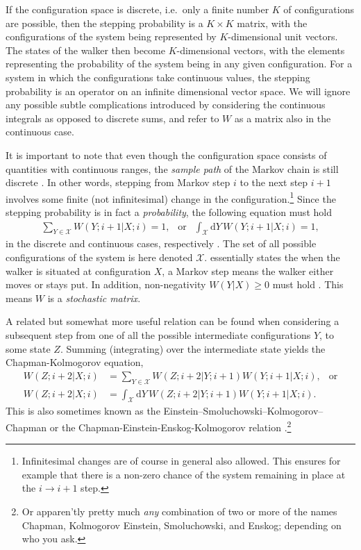 \documentclass[../../master.tex]{subfiles}
\begin{document}
If the configuration space is discrete, i.e.\ only a finite number $K$ of configurations are possible, then the stepping probability is a $K\times K$ matrix, with the configurations of the system being represented by $K$-dimensional unit vectors. The states of the walker then become $K$-dimensional vectors, with  the elements representing the probability of the system being in any given configuration. For a system in which the configurations take continuous values, the stepping probability is an operator on an infinite dimensional vector space. We will ignore any possible subtle complications introduced by considering the continuous integrals as opposed to discrete sums, and refer to $W$ as a matrix also in the continuous case.

It is important to note that even though the configuration space consists of quantities with continuous ranges, the \emph{sample path} of the Markov chain is still discrete \cite{gardiner}. In other words, stepping from Markov step $i$ to the next step $i+1$ involves some finite (not infinitesimal) change in the configuration.\footnote{Infinitesimal changes are of course in general also allowed. This ensures for example that there is a non-zero chance of the system remaining in place at the $i\rightarrow i+1$ step.} Since the stepping probability is in fact a \emph{probability}, the following equation must hold
\begin{align}
\sum_{Y\in\mathcal{X}}W(Y;i+1|X;i)=1, \ \ \text{ or } \ \ \int_{\mathcal{X}}\mathrm{d}Y\,W(Y;i+1|X;i)=1, \label{eq:VMC2}
\end{align}
in the discrete and continuous cases, respectively \cite{hammond}. The set of all possible configurations of the system is here denoted $\mathcal{X}$.  essentially states the when the walker is situated at configuration $X$, a Markov step means the walker either moves or stays put. In addition, non-negativity $W(Y|X)\ge0$ must hold \cite{assaraf}. This means $W$ is a \emph{stochastic matrix}. 

A related but somewhat more useful relation can be found when considering a subsequent step from one of all the possible intermediate configurations $Y$, to some state $Z$. Summing (integrating) over the intermediate state yields the Chapman-Kolmogorov equation, \cite{gardiner}
\begin{align}
W(Z;i+2|X;i) &= \sum_{Y\in\mathcal{X}}W(Z;i+2|Y;i+1)W(Y;i+1|X;i), \ \ \text{ or} \\
% 
W(Z;i+2|X;i) &= \int_{\mathcal{X}}\mathrm{d}Y\,W(Z;i+2|Y;i+1)W(Y;i+1|X;i). \label{eq:VMC3}
\end{align}
This is also sometimes known as the Einstein–Smoluchowski–Kolmogorov–Chapman or the Chapman-Einstein-Enskog-Kolmogorov relation \cite{chaichian,hjorth-jensen}.\footnote{Or apparen'tly pretty much \emph{any} combination of two or more of the names Chapman, Kolmogorov Einstein, Smoluchowski, and Enskog; depending on who you ask.} 
\end{document}
